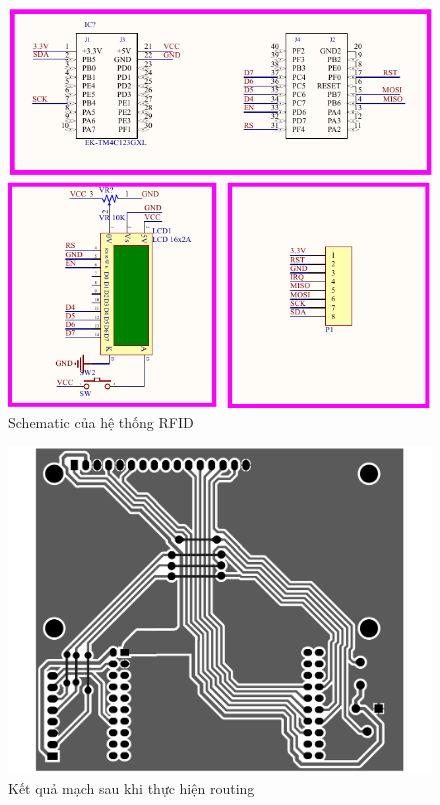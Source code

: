 \begin{figure}[ht]
\centering
\includegraphics[scale=0.75]{images/schematic.png}
\caption{Schematic của hệ thống RFID}
\label{fig:schematic}
\end{figure}

\begin{figure}[ht]
\centering
\includegraphics[scale=0.35]{images/routed.pdf}
\caption{Kết quả mạch sau khi thực hiện routing}
\label{fig:pcb_routing}
\end{figure}

